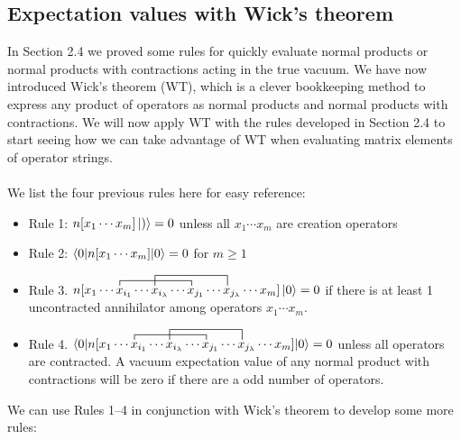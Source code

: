 \documentclass{article}
\newcommand{\cd}{\ensuremath{\cdots} }
\begin{document}
\subsection{Expectation values with Wick's theorem }
In Section 2.4 we proved some rules for quickly evaluate normal products or normal products with contractions acting in the true vacuum. 
We have now introduced Wick's theorem (WT), which is a clever bookkeeping method to express any product of operators as normal products and normal products with contractions. 
We will now apply WT with the rules developed in Section 2.4 to start seeing how we can take advantage of WT when evaluating matrix elements of operator strings. 
\\ \\
We list the four previous rules here for easy reference: 
\begin{itemize}
\item Rule 1: $n[x_1 \cd x_m]\ket{)} = 0$ unless all $x_1 \cd x_m$ are creation operators \\
\item Rule 2: $\braket{0 | n[x_1 \cd x_m] | 0} = 0$ for  $m \geq 1$ \\
\item Rule 3. $\contraction{n[x_1 \cd }{x}{{}_{i_1} \cd x_{i_\lambda} \cd }{x}
\contraction[2ex]{n[x_1 \cd x_{i_1} \cd}{ x}{{}_{i_\lambda} \cd x_{j_1} \cd }{x} 
n[x_1 \cd x_{i_1} \cd x_{i_\lambda} \cd x_{j_1} \cd x_{j_\lambda} \cd x_m] \ket{0} = 0$ if there is at least 1 uncontracted annihilator among operators $x_1 \cd x_m$.  \\
\item Rule 4. $\braket{0| \contraction{n[x_1 \cd }{x}{{}_{i_1} \cd x_{i_\lambda} \cd }{x}
\contraction[2ex]{n[x_1 \cd x_{i_1} \cd}{ x}{{}_{i_\lambda} \cd x_{j_1} \cd }{x} 
n[x_1 \cd x_{i_1} \cd x_{i_\lambda} \cd x_{j_1} \cd x_{j_\lambda} \cd x_m] |0} = 0$ unless all operators are contracted.
A vacuum expectation value of any normal product with contractions will be zero if there are a odd number of operators. \\
\end{itemize}

We can use Rules 1--4 in conjunction with Wick's theorem to develop some more rules: 
\end{document}
